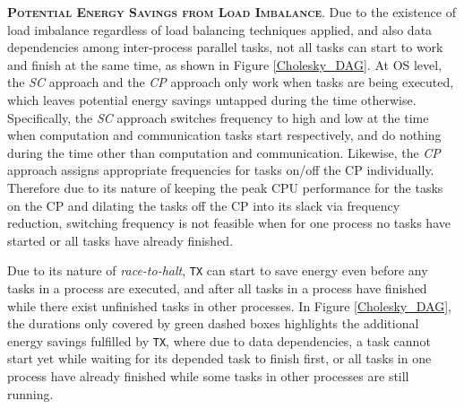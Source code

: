 \documentclass[12pt]{elsarticle}
\begin{document}
\vspace{1mm}
\noindent\textsc{\textbf{Potential Energy Savings from Load Imbalance}}. Due to the existence of load imbalance regardless of load balancing techniques applied, and also data dependencies among inter-process parallel tasks, not all tasks can start to work and finish at the same time, as shown in Figure \ref{Cholesky_DAG}. At OS level, the \emph{SC} approach and the \emph{CP} approach only work when tasks are being executed, which leaves potential energy savings untapped during the time otherwise. Specifically, the \emph{SC} approach switches frequency to high and low at the time when computation and communication tasks start respectively, and do nothing during the time other than computation and communication. Likewise, the \emph{CP} approach assigns appropriate frequencies for tasks on/off the CP individually. Therefore due to its nature of keeping the peak CPU performance for the tasks on the CP and dilating the tasks off the CP into its slack via frequency reduction, switching frequency is not feasible when for one process no tasks have started or all tasks have already finished.

Due to its nature of \emph{race-to-halt}, \texttt{TX} can start to save energy even before any tasks in a process are executed, and after all tasks in a process have finished while there exist unfinished tasks in other processes. In Figure \ref{Cholesky_DAG}, the durations only covered by green dashed boxes highlights the additional energy savings fulfilled by \texttt{TX}, where due to data dependencies, a task cannot start yet while waiting for its depended task to finish first, or all tasks in one process have already finished while some tasks in other processes are still running.
\end{document}
